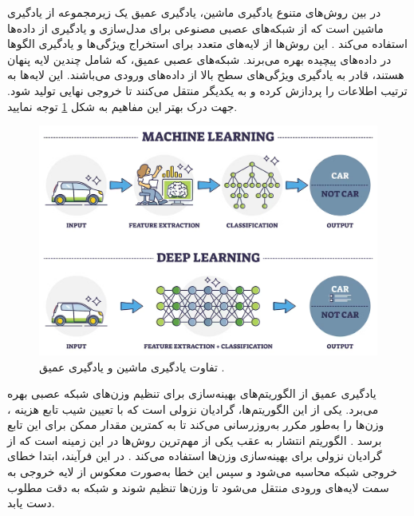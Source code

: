 در بین روش‌های متنوع یادگیری ماشین، یادگیری عمیق یک زیرمجموعه از یادگیری ماشین است که از شبکه‌های عصبی مصنوعی برای مدل‌سازی و یادگیری از داده‌ها استفاده می‌کند
\cite{gavrilova2020artificial}.
این روش‌ها از لایه‌های متعدد برای استخراج ویژگی‌ها و یادگیری الگوها در داده‌های پیچیده بهره می‌برند. شبکه‌های عصبی عمیق، که شامل چندین لایه پنهان%
هستند، قادر به یادگیری ویژگی‌های سطح بالا از داده‌های ورودی می‌باشند. این لایه‌ها به ترتیب اطلاعات را پردازش کرده و به یکدیگر منتقل می‌کنند تا خروجی نهایی تولید شود. جهت درک بهتر این مفاهیم به شکل
\ref{machine_learning_vs_deep_learning}
توجه نمایید.


\begin{figure}[t]
	\centering
	\includegraphics[scale=0.28]{images/chap2/machine_learning_vs_deep_learning.png}%
	\caption{%
تفاوت یادگیری ماشین و یادگیری عمیق
		\cite{AIT2024Deep}.
	}
	\label{machine_learning_vs_deep_learning}
	\centering
\end{figure}



یادگیری عمیق از الگوریتم‌های بهینه‌سازی برای تنظیم وزن‌های شبکه عصبی بهره می‌برد. یکی از این الگوریتم‌ها، گرادیان نزولی%
است که با تعیین شیب تابع هزینه%
%
، وزن‌ها را به‌طور مکرر به‌روزرسانی می‌کند تا به کمترین مقدار ممکن برای این تابع برسد
\cite{lecun1998gradient}.
الگوریتم انتشار به عقب%
یکی از مهم‌ترین روش‌ها در این زمینه است که از گرادیان نزولی برای بهینه‌سازی وزن‌ها استفاده می‌کند
\cite{lecun1998gradient}.
در این فرآیند، ابتدا خطای خروجی شبکه محاسبه می‌شود و سپس این خطا به‌صورت معکوس از لایه خروجی به سمت لایه‌های ورودی منتقل می‌شود تا وزن‌ها تنظیم شوند و شبکه به دقت مطلوب دست یابد.


